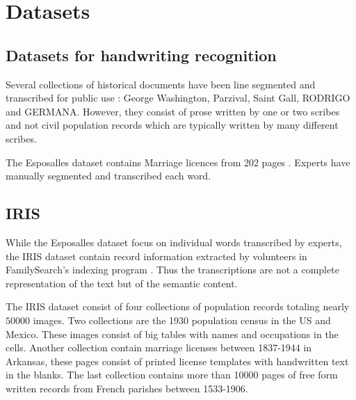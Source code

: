 \section{Datasets}


\subsection{Datasets for handwriting recognition}

Several collections of historical documents have been line segmented and transcribed for public use \cite{esposalles}: George Washington, Parzival, Saint Gall, RODRIGO and GERMANA. However, they consist of prose written by one or two scribes and not civil population records which are typically written by many different scribes.

The Esposalles dataset contains Marriage licences from 202 pages \cite{esposalles}. Experts have manually segmented and transcribed each word.






\subsection{IRIS}

While the Esposalles dataset focus on individual words transcribed by experts, the IRIS dataset contain record information extracted by volunteers in FamilySearch's indexing program \cite{Iris}. Thus the transcriptions are not a complete representation of the text but of the semantic content.

The IRIS dataset consist of four collections of population records totaling nearly $50000$ images. Two collections are the 1930 population census in the US and Mexico. These images consist of big tables with names and occupations in the cells. Another collection contain marriage licenses between 1837-1944 in Arkansas, these pages consist of printed license templates with handwritten text in the blanks. The last collection contains more than 10000 pages of free form written records from French parishes between 1533-1906.

